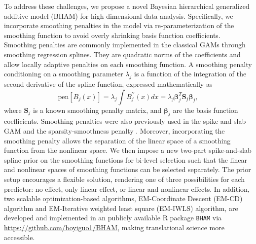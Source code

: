 \documentclass[AMA,STIX1COL,]{WileyNJD-v2}
\begin{document}
To address these challenges, we propose a novel Bayesian hierarchical
generalized additive model (BHAM) for high dimensional data analysis.
Specifically, we incorporate smoothing penalties in the model via
re-parameterization of the smoothing function to avoid overly shrinking
basis function coefficients. Smoothing penalties are commonly
implemented in the classical GAMs through smoothing regression splines.
They are quadratic norms of the coefficients and allow locally adaptive
penalties on each smoothing function. A smoothing penalty conditioning
on a smoothing parameter \(\lambda_j\) is a function of the integration
of the second derivative of the spline function, expressed
mathematically as \begin{equation}\label{eq:smoothpen}
  \text{pen}\left[B_j(x)\right] = \lambda_j \int B^{\prime\prime}_j(x)dx = \lambda_j \boldsymbol{\beta}_j^T \boldsymbol{S}_j \boldsymbol{\beta}_j ,
\end{equation} where \(\boldsymbol{S}_j\) is a known smoothing penalty
matrix, and \(\boldsymbol{\beta}_j\) are the basis function
coefficients. Smoothing penalties were also previously used in the
spike-and-slab GAM \citep{Scheipl2012} and the sparsity-smoothness
penalty \citep{Meier2009}. Moreover, incorporating the smoothing penalty
allows the separation of the linear space of a smoothing function from
the nonlinear space. We then impose a new two-part spike-and-slab spline
prior on the smoothing functions for bi-level selection such that the
linear and nonlinear spaces of smoothing functions can be selected
separately. The prior setup encourages a flexible solution, rendering
one of three possibilities for each predictor: no effect, only linear
effect, or linear and nonlinear effects. In addition, two scalable
optimization-based algorithms, EM-Coordinate Descent (EM-CD) algorithm
and EM-Iterative weighted least square (EM-IWLS) algorithm, are
developed and implemented in an publicly available R package
\texttt{BHAM} via \url{https://github.com/boyiguo1/BHAM}, making
translational science more accessible.
\end{document}

